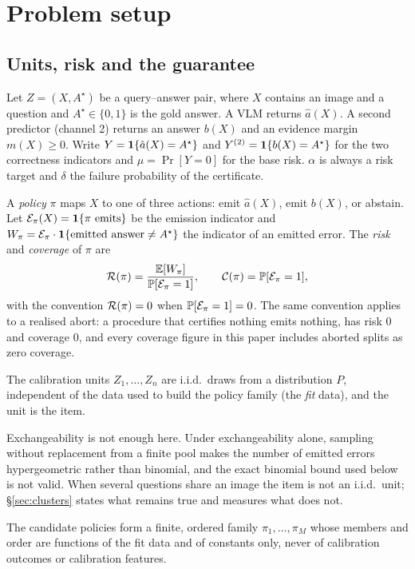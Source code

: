 \section{Problem setup}
\label{sec:setup}

\subsection{Units, risk and the guarantee}

Let $Z=(X,A^\star)$ be a query--answer pair, where $X$ contains an image and a question and
$A^\star\in\{0,1\}$ is the gold answer. A VLM returns $\hat a(X)$. A second predictor (channel 2)
returns an answer $b(X)$ and an evidence margin $m(X)\ge0$. Write $Y=\mathbf{1}\{\hat a(X)=A^\star\}$ and
$Y^{(2)}=\mathbf{1}\{b(X)=A^\star\}$ for the two correctness indicators and $\mu=\Pr[Y=0]$ for the base
risk. $\alpha$ is always a risk target and $\delta$ the failure probability of the certificate.

A \emph{policy} $\pi$ maps $X$ to one of three actions: emit $\hat a(X)$, emit $b(X)$, or abstain.
Let $\mathcal{E}_\pi(X)=\mathbf{1}\{\pi\text{ emits}\}$ be the emission indicator and
$W_\pi=\mathcal{E}_\pi\cdot\mathbf{1}\{\text{emitted answer}\ne A^\star\}$ the indicator of an emitted error. The
\emph{risk} and \emph{coverage} of $\pi$ are
\[
\mathcal{R}(\pi)=\frac{\mathbb{E}[W_\pi]}{\mathbb{P}[\mathcal{E}_\pi=1]},\qquad \mathcal{C}(\pi)=\mathbb{P}[\mathcal{E}_\pi=1],
\]
with the convention $\mathcal{R}(\pi)=0$ when $\mathbb{P}[\mathcal{E}_\pi=1]=0$. The same convention applies to a
realised abort: a procedure that certifies nothing emits nothing, has risk $0$ and coverage $0$,
and every coverage figure in this paper includes aborted splits as zero coverage.

\begin{assumption}
\label{ass:iid}
The calibration units $Z_1,\dots,Z_n$ are i.i.d.\ draws from a distribution $P$, independent of the
data used to build the policy family (the \emph{fit} data), and the unit is the item.
\end{assumption}

Exchangeability is not enough here. Under exchangeability alone, sampling without replacement from
a finite pool makes the number of emitted errors hypergeometric rather than binomial, and the exact
binomial bound used below is not valid. When several questions share an image the item is not an
i.i.d.\ unit; \S\ref{sec:clusters} states what remains true and measures what does not.

\begin{assumption}
\label{ass:family}
The candidate policies form a finite, ordered family $\pi_1,\dots,\pi_M$ whose members and order
are functions of the fit data and of constants only, never of calibration outcomes or calibration
features.
\end{assumption}

